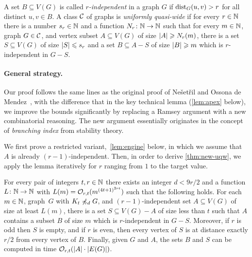 
 

A set $B\subseteq V(G)$ is called {\em{$r$-independent}} in a graph $G$ if  $\mathrm{dist}_G(u,v)>r$ for all
distinct $u,v\in B$. 
A class $\mathcal{C}$ of graphs is \emph{uniformly quasi-wide} if for every $r\in \mathbb{N}$ there is a number $s_r\in \mathbb{N}$
and a function $N_r\colon\mathbb{N}\to\mathbb{N}$ such that
for every $m\in \mathbb{N}$, graph $G\in \mathcal{C}$, and vertex subset $A\subseteq V(G)$ of size $\left\lvert A\right\rvert\geqslant N_r(m)$, there is a set
$S\subseteq V(G)$ of size $\left\lvert S\right\rvert\leqslant s_r$ and a set
$B\subseteq A-S$ of size $\left\lvert B\right\rvert\geqslant m$ 
which is $r$-independent in $G-S$.



\paragraph{General strategy.}
Our proof follows the same lines as the original proof of Ne\v set\v ril and Ossona de Mendez~\cite{nevsetvril2011nowhere}, with the difference that in the key technical lemma (\cref{lem:apex} below), 
we improve the bounds significantly by replacing a Ramsey argument with a new combinatorial reasoning.
The new argument essentially originates in the concept of {\em{branching index}} from stability theory. 

We first prove a restricted variant,~\cref{lem:engine} below, in which we assume that $A$ is already $(r-1)$-independent. Then, in order to derive
\cref{thm:new-uqw}, we apply the lemma iteratively for $r$ ranging from $1$ to the target value.

\begin{lemma}\label{lem:engine}
For every pair of integers $t,r\in \mathbb{N}$ there exists an integer $d<9r/2$ and a function $L\colon \mathbb{N}\to \mathbb{N}$ with $L(m)=\mathcal{O}_{r,t}{(m^{{(4t+1)}^{2rt}})}$ such that the following holds.
For each $m\in \mathbb{N}$, graph~$G$ with $K_t\not\preccurlyeq_{d} G$, and
$(r-1)$-independent set $A\subseteq V(G)$ of size at least $L(m)$, there is a set $S\subseteq V(G)-A$ of size less than $t$ such that $A$ contains a subset $B$ of size $m$ which is $r$-independent in $G-S$.
Moreover, if $r$ is odd then $S$ is empty, and if $r$ is even,
then every vertex of $S$ is at distance exactly $r/2$ from every vertex of $B$.
Finally, given $G$ and $A$, the sets $B$ and $S$ can be computed in time $\mathcal{O}_{r,t}(|A|\cdot |E(G)|)$.
\end{lemma}

